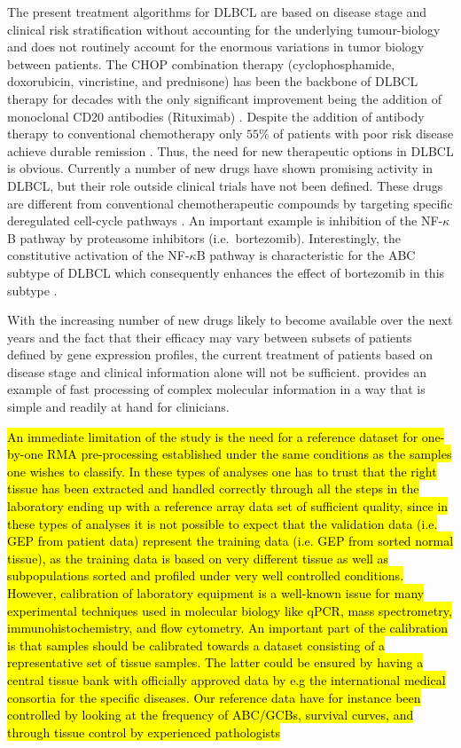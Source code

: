 \documentclass{article}
\begin{document}
The present treatment algorithms for DLBCL are based on disease stage and clinical risk stratification without accounting for the underlying tumour-biology \citep{Schmoll2012} and does not routinely account for the enormous variations in tumor biology between patients.
The CHOP combination therapy (cyclophosphamide, doxorubicin, vincristine, and prednisone) has been the backbone of DLBCL therapy for decades with the only significant improvement being the addition of monoclonal CD20 antibodies (Rituximab) \citep{Coiffier2002a}.
Despite the addition of antibody therapy to conventional chemotherapy only $55\%$ of patients with poor risk disease achieve durable remission \citep{Ziepert2010}.
Thus, the need for new therapeutic options in DLBCL is obvious.
Currently a number of new drugs have shown promising activity in DLBCL, but their role outside clinical trials have not been defined.
These drugs are different from conventional chemotherapeutic compounds by targeting specific deregulated cell-cycle pathways \citep{Friedberg2011}.
An important example is inhibition of the NF-$\kappa$B pathway by proteasome inhibitors (i.e.\ bortezomib).
Interestingly, the constitutive activation of the NF-$\kappa$B pathway is characteristic for the ABC subtype of DLBCL which consequently enhances the effect of bortezomib in this subtype \citep{Dunleavy2009}.

With the increasing number of new drugs likely to become available over the next years and the fact that their efficacy may vary between subsets of patients defined by gene expression profiles, the current treatment of patients based on disease stage and clinical information alone will not be sufficient.
\hemaClass{} provides an example of fast processing of complex molecular information in a way that is simple and readily at hand for clinicians.

\hl{An immediate limitation of the study is the need for a reference dataset for one-by-one RMA pre-processing established under the same conditions as the samples one wishes to classify. In these types of analyses one has to trust that the right tissue has been extracted and handled correctly through all the steps in the laboratory ending up with a reference array data set of sufficient quality, since in these types of analyses it is not possible to expect that the validation data (i.e. GEP from patient data) represent the training data (i.e. GEP from sorted normal tissue), as the training data is based on very different tissue as well as subpopulations sorted and profiled under very well controlled conditions.
However, calibration of laboratory equipment is a well-known issue for many experimental techniques used in molecular biology like qPCR, mass spectrometry, immunohistochemistry, and flow cytometry. An important part of the calibration is that samples should be calibrated towards a dataset consisting of a representative set of tissue samples. The latter could be ensured by having a central tissue bank with officially approved data by e.g the international medical consortia for the specific diseases. Our reference data have for instance been controlled by looking at the frequency of ABC/GCBs, survival curves, and through tissue control by experienced pathologists}
\end{document}
